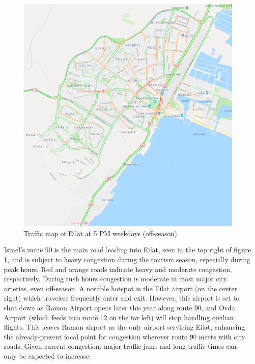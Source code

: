 \documentclass[12pt]{article}                       %
\begin{document}
\begin{figure}[H]
    \centering
    \includegraphics[scale=1]{images/eilat_traffic.png}
    \caption{Traffic map of Eilat at 5 PM weekdays (off-season)}
    \label{img:eilatTraffic}
\end{figure}

Israel's route 90 is the main road leading into Eilat, seen in the top right of figure \ref{img:eilatTraffic}, and is subject to heavy congestion during the tourism season, especially during peak hours. Red and orange roads indicate heavy and moderate congestion, respectively. During rush hours congestion is moderate in most major city arteries, even off-season. A notable hotspot is the Eilat airport (on the center right) which travelers frequently enter and exit. However, this airport is set to shut down as Ramon Airport opens later this year along route 90, and Ovda Airport (which feeds into route 12 on the far left) will stop handling civilian flights. This leaves Ramon airport as the only airport servicing Eilat, enhancing the already-present focal point for congestion wherever route 90 meets with city roads. Given current congestion, major traffic jams and long traffic times can only be expected to increase.

\end{document}
